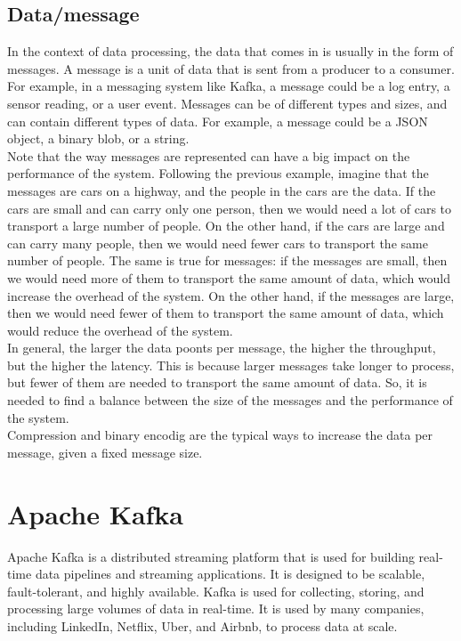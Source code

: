 \subsection{Data/message}

In the context of data processing, the data that comes in is usually in the form of messages. A message
is a unit of data that is sent from a producer to a consumer. For example, in a messaging system like Kafka,
a message could be a log entry, a sensor reading, or a user event. Messages can be of different types and sizes,
and can contain different types of data. For example, a message could be a JSON object, a binary blob, or a string.\\

Note that the way messages are represented can have a big impact on the performance of the system. Following the 
previous example, imagine that the messages are cars on a highway, and the people in the cars are the data. If the cars
are small and can carry only one person, then we would need a lot of cars to transport a large number of people. On the
other hand, if the cars are large and can carry many people, then we would need fewer cars to transport the same number
of people. The same is true for messages: if the messages are small, then we would need more of them to transport the same
amount of data, which would increase the overhead of the system. On the other hand, if the messages are large, then we would
need fewer of them to transport the same amount of data, which would reduce the overhead of the system.\\

In general, the larger the data poonts per message, the higher the throughput, but the higher the latency. This is because
larger messages take longer to process, but fewer of them are needed to transport the same amount of data.
So, it is needed to find a balance between the size of the messages and the performance of the system.\\

Compression and binary encodig are the typical ways to increase the data per message, given a fixed message size.

\section{Apache Kafka}

Apache Kafka is a distributed streaming platform that is used for building real-time data 
pipelines and streaming applications. It is designed to be scalable, fault-tolerant, and
highly available. Kafka is used for collecting, storing, and processing large volumes of data
in real-time. It is used by many companies, including LinkedIn, Netflix, Uber, and Airbnb, to
process data at scale.

